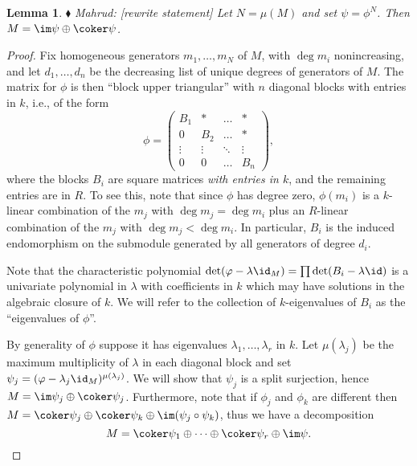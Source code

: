 \documentclass[12pt]{article}
\let\b\beta
\def\ZZ{\mathbb Z}
\theoremstyle{theorem}
\numberwithin{thm}{section}
\newtheorem{lem}[thm]{Lemma}
\theoremstyle{definition}
\newcommand{\mahrud}[1]{{\color{ForestGreen} \sf $\blacklozenge$ Mahrud: [#1]}}
\begin{document}

\begin{lem}\label{lem:graded}
  \mahrud{rewrite statement} Let $N = \mu(M)$ and set $\psi = \phi^N$. Then $M = \im\psi \oplus \coker\psi$.
\end{lem}
\begin{proof}
  Fix homogeneous generators $m_1,\dots,m_N$ of $M$, with $\deg m_i$ nonincreasing, and let $d_1,\dots,d_n$ be the decreasing list of unique degrees of generators of $M$. The matrix for $\phi$ is then ``block upper triangular'' with $n$ diagonal blocks with entries in $k$, i.e., of the form
  \begin{equation}\label{eq:blocks}
    \phi = \begin{pmatrix}
    B_1    & *      & \dots  & *      \\
    0      & B_2    & \dots  & *      \\
    \vdots & \vdots & \ddots & \vdots \\
    0      & 0      & \dots  & B_n
    \end{pmatrix},
  \end{equation}
  where the blocks $B_i$ are square matrices \emph{with entries in $k$}, and the remaining entries are in $R$. To see this, note that since $\phi$ has degree zero, $\phi(m_i)$ is a $k$-linear combination of the $m_j$ with $\deg m_j = \deg m_i$ plus an $R$-linear combination of the $m_j$ with $\deg m_j < \deg m_i$. In particular, $B_i$ is the induced endomorphism on the submodule generated by all generators of degree $d_i$.

  Note that the characteristic polynomial $\det(\phi - \lambda \id_M) = \prod \det(B_i - \lambda \id)$ is a univariate polynomial in $\lambda$ with coefficients in $k$ which may have solutions in the algebraic closure of $k$. We will refer to the collection of $k$-eigenvalues of $B_i$ as the ``eigenvalues of $\phi$''.

  By generality of $\phi$ suppose it has eigenvalues $\lambda_1,\dots,\lambda_r$ in $k$. Let $\mu(\lambda_j)$ be the maximum multiplicity of $\lambda$ in each diagonal block and set $\psi_j = (\phi - \lambda_j \id_M)^{\mu(\lambda_j)}$. We will show that $\psi_j$ is a split surjection, hence $M = \im\psi_j \oplus \coker\psi_j$. Furthermore, note that if $\phi_j$ and $\phi_k$ are different then $M = \coker\psi_j \oplus \coker\psi_k \oplus \im(\psi_j\circ\psi_k)$, thus we have a decomposition
  \begin{equation}\label{eq:decomposition}
    M = \coker\psi_1 \oplus \cdots \oplus \coker\psi_r \oplus \im\psi.
  \end{equation}


\end{proof}
\end{document}
